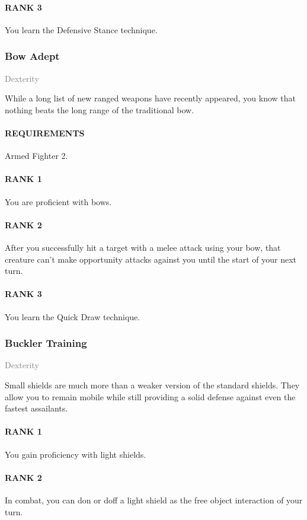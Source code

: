 \paragraph{RANK 3} You learn the Defensive Stance technique.

\subsubsection{Bow Adept} \label{feat::bowadept}
\small{\textcolor{gray}{Dexterity}}

\normalsize
While a long list of new ranged weapons have recently appeared, you know that nothing beats the long range of the traditional bow.
\paragraph{REQUIREMENTS} Armed Fighter 2.
\paragraph{RANK 1} You are proficient with bows.
\paragraph{RANK 2} After you successfully hit a target with a melee attack using your bow, that creature can't make opportunity attacks against you until the start of your next turn.
\paragraph{RANK 3} You learn the Quick Draw technique.

\subsubsection{Buckler Training} \label{feat::bucklertraining}
\small{\textcolor{gray}{Dexterity}}

\normalsize
Small shields are much more than a weaker version of the standard shields.
They allow you to remain mobile while still providing a solid defense against even the fastest assailants.
\paragraph{RANK 1} You gain proficiency with light shields.
\paragraph{RANK 2} In combat, you can don or doff a light shield as the free object interaction of your turn.
